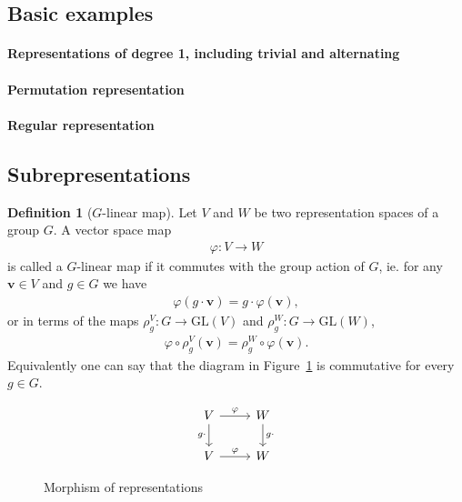 \documentclass[12pt, a4paper, twoside]{article}
\theoremstyle{definition}
\newtheorem{definition}{Definition}[section]
\theoremstyle{remark}
\numberwithin{equation}{section}
\newcommand{\1}{\mathbf{1}}
\newcommand{\0}{\mathbf{0}}
\newcommand{\GL}{\text{GL}}
\newcommand{\vvec}{\mathbf{v}}
\begin{document}
\subsection{Basic examples}
\paragraph{Representations of degree 1, including trivial and alternating}
\paragraph{Permutation representation}
\paragraph{Regular representation}


\subsection{Subrepresentations}
	

	\begin{definition}[$G$-linear map]\cite{FultonHarris}
		Let $V$ and $W$ be two representation spaces of a group $G$. A vector space map 
		\begin{align*}
			\varphi: V \rightarrow W
		\end{align*} 
		is called a $G$-linear map if it commutes with the group action of $G$, ie. for any $\vvec \in V$ and $g \in G$ we have
		\begin{align*}
			\varphi( g \cdot \vvec ) = g \cdot \varphi (\vvec),
		\end{align*}
		or in terms of the maps $\rho_g^V: G \rightarrow \GL(V)$ and $\rho_g^W: G \rightarrow \GL(W)$,
		\begin{align*}
			\varphi \circ \rho^V_g (\vvec) = \rho^W_g \circ \varphi (\vvec).
		\end{align*}
		Equivalently one can say that the diagram in Figure~\ref*{fig:commapmorp} is commutative for every $g \in G$.
		\begin{figure}%
			\centering
			\[\begin{tikzcd}
				V \arrow{r}{\varphi} \arrow[swap]{d}{g \cdot} & W \arrow{d}{g \cdot} \\
				V \arrow{r}{\varphi} & W
			\end{tikzcd}\]
			\caption{Morphism of representations}
			\label{fig:commapmorp}
		\end{figure}
	\end{definition}
	
\end{document}
